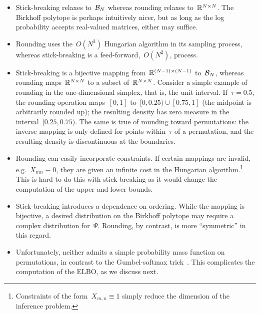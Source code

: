 \documentclass[twoside]{article}
\begin{document}
\begin{itemize}
\item Stick-breaking relaxes to~$\mathcal{B}_N$ whereas rounding relaxes
  to~$\mathbb{R}^{N \times N}$. The Birkhoff polytope is perhaps
  intuitively nicer, but as long as the log probability accepts
  real-valued matrices, either may suffice.
  
\item Rounding uses the~$O(N^3)$ Hungarian algorithm in its sampling
  process, whereas stick-breaking is a feed-forward,~$O(N^2)$, process.
  
\item Stick-breaking is a bijective mapping from~$\mathbb{R}^{(N-1) \times (N-1)}$ to~$\mathcal{B}_N$, whereas rounding maps~$\mathbb{R}^{N \times N}$ to a subset of~$\mathbb{R}^{N \times N}$.  Consider a simple example of rounding in the one-dimensional simplex, that is, the unit interval.  If~$\tau = 0.5$, the rounding operation maps~$[0,1]$ to~${[0,0.25) \cup [0.75, 1]}$ (the midpoint is arbitrarily rounded up); the resulting density has zero measure in the interval~$[0.25, 0.75)$.  The same is true of rounding toward permutations: the inverse mapping is only defined for points within~$\tau$ of a permutation, and the resulting density is discontinuous at the boundaries. 
  
\item Rounding can easily incorporate constraints.  If certain
  mappings are invalid, e.g.~${X_{mn} \equiv 0}$, they are given an
  infinite cost in the Hungarian algorithm.\footnote{Constraints of
    the form~$X_{m,n} \equiv 1$ simply reduce the dimension of the
    inference problem.}  This is hard to do this with stick breaking
  as it would change the computation of the upper and lower bounds.
  
\item Stick-breaking introduces a dependence on ordering.  While the
  mapping is bijective, a desired distribution on the Birkhoff polytope
  may require a complex distribution for~$\Psi$.  Rounding, by contrast,
  is more ``symmetric'' in this regard.
  
\item Unfortunately, neither admits a simple probability mass function
  on permutations, in contrast to the Gumbel-softmax
  trick~\citep{maddison2016concrete, jang2016categorical}.  This
  complicates the computation of the ELBO, as we discuss next.
\end{itemize}
\end{document}
